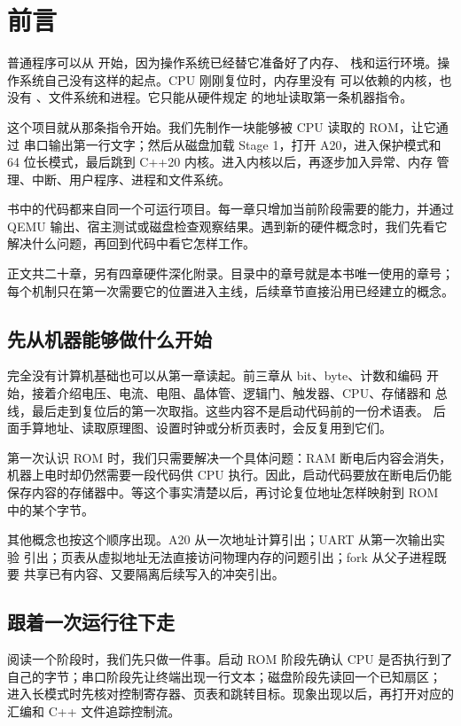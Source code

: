 \chapter*{前言}

普通程序可以从  开始，因为操作系统已经替它准备好了内存、
栈和运行环境。操作系统自己没有这样的起点。CPU 刚刚复位时，内存里没有
可以依赖的内核，也没有 、文件系统和进程。它只能从硬件规定
的地址读取第一条机器指令。

这个项目就从那条指令开始。我们先制作一块能够被 CPU 读取的 ROM，让它通过
串口输出第一行文字；然后从磁盘加载 Stage 1，打开 A20，进入保护模式和
64 位长模式，最后跳到 C++20 内核。进入内核以后，再逐步加入异常、内存
管理、中断、用户程序、进程和文件系统。

书中的代码都来自同一个可运行项目。每一章只增加当前阶段需要的能力，并通过
QEMU 输出、宿主测试或磁盘检查观察结果。遇到新的硬件概念时，我们先看它
解决什么问题，再回到代码中看它怎样工作。

正文共二十章，另有四章硬件深化附录。目录中的章号就是本书唯一使用的章号；
每个机制只在第一次需要它的位置进入主线，后续章节直接沿用已经建立的概念。

\section*{先从机器能够做什么开始}

完全没有计算机基础也可以从第一章读起。前三章从 bit、byte、计数和编码
开始，接着介绍电压、电流、电阻、晶体管、逻辑门、触发器、CPU、存储器和
总线，最后走到复位后的第一次取指。这些内容不是启动代码前的一份术语表。
后面手算地址、读取原理图、设置时钟或分析页表时，会反复用到它们。

第一次认识 ROM 时，我们只需要解决一个具体问题：RAM 断电后内容会消失，
机器上电时却仍然需要一段代码供 CPU 执行。因此，启动代码要放在断电后仍能
保存内容的存储器中。等这个事实清楚以后，再讨论复位地址怎样映射到 ROM
中的某个字节。

其他概念也按这个顺序出现。A20 从一次地址计算引出；UART 从第一次输出实验
引出；页表从虚拟地址无法直接访问物理内存的问题引出；fork 从父子进程既要
共享已有内容、又要隔离后续写入的冲突引出。

\section*{跟着一次运行往下走}

阅读一个阶段时，我们先只做一件事。启动 ROM 阶段先确认 CPU 是否执行到了
自己的字节；串口阶段先让终端出现一行文本；磁盘阶段先读回一个已知扇区；
进入长模式时先核对控制寄存器、页表和跳转目标。现象出现以后，再打开对应的
汇编和 C++ 文件追踪控制流。

